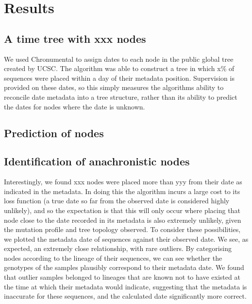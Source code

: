 \section*{Results}

\subsection*{A time tree with xxx nodes}

We used Chronumental to assign dates to each node in the public global tree created by UCSC. The algorithm was able to construct a tree in which x\% of sequences were placed within a day of their metadata position. Supervision is provided on these dates, so this simply measures the algorithms ability to reconcile date metadata into a tree structure, rather than its ability to predict the dates for nodes where the date is unknown.

\subsection*{Prediction of nodes}


\subsection*{Identification of anachronistic nodes}

Interestingly, we found xxx nodes were placed more than yyy from their date as indicated in the metadata. In doing this the algorithm incurs a large cost to its loss function (a true date so far from the observed date is considered highly unlikely), and so the expectation is that this will only occur where placing that node close to the date recorded in its metadata is also extremely unlikely, given the mutation profile and tree topology observed. To consider these possibilities, we plotted the metadata date of sequences against their observed date. We see, as expected, an extremely close relationship, with rare outliers. By categorising nodes according to the lineage of their sequences, we can see whether the genotypes of the samples plausibly correspond to their metadata date. We found that outlier samples belonged to lineages that are known not to have existed at the time at which their metadata would indicate, suggesting that the metadata is inaccurate for these sequences, and the calculated date significantly more correct. 

